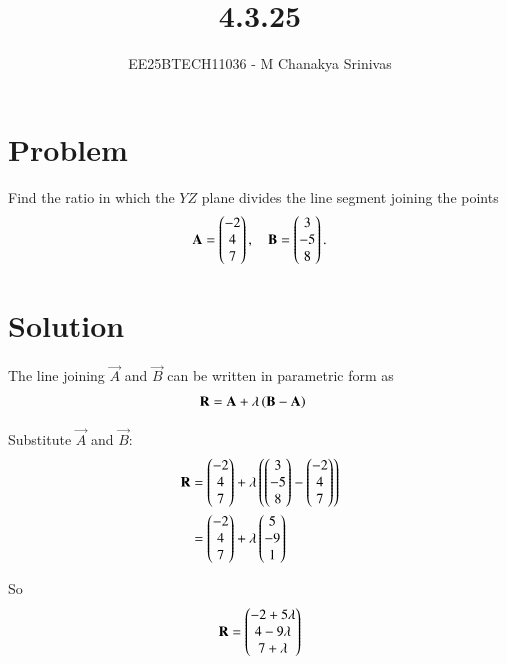 \documentclass[journal]{IEEEtran}
\begin{document}

\vspace{3cm}

\title{4.3.25}
\author{EE25BTECH11036 - M Chanakya Srinivas}
\maketitle

\renewcommand{\thetable}{\theenumi}
\setlength{\intextsep}{10pt}
\renewcommand\theequation{\arabic{equation}}


\section*{Problem}
Find the ratio in which the $YZ$ plane divides the line segment joining the points 
\[
\mathbf{A} = \begin{pmatrix}-2\\4\\7\end{pmatrix}, \quad 
\mathbf{B} = \begin{pmatrix}3\\-5\\8\end{pmatrix}.
\]

\section*{Solution}

The line joining $\vec{A}$ and $\vec{B}$ can be written in parametric form as
\begin{align}
\mathbf{R} &= \mathbf{A} + \lambda\left(\mathbf{B}-\mathbf{A}\right) \label{eq:line}
\end{align}

Substitute $\vec{A}$ and $\vec{B}$:
\begin{align}
\mathbf{R} 
&= \begin{pmatrix}-2\\4\\7\end{pmatrix} + \lambda \left(\begin{pmatrix}3\\-5\\8\end{pmatrix}-\begin{pmatrix}-2\\4\\7\end{pmatrix}\right) \\
&= \begin{pmatrix}-2\\4\\7\end{pmatrix} + \lambda \begin{pmatrix}5\\-9\\1\end{pmatrix} \label{eq:expand}
\end{align}

So
\begin{align}
\mathbf{R} = \begin{pmatrix}-2+5\lambda \\ 4-9\lambda \\ 7+\lambda\end{pmatrix}
\end{align}
\end{document}
